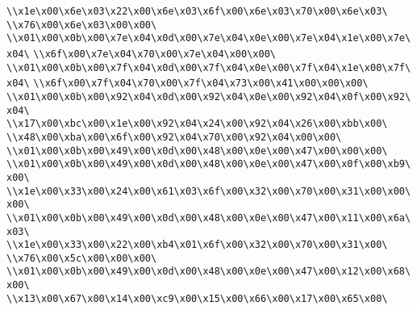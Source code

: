 \verb|\\x1e\x00\x6e\x03\x22\x00\x6e\x03\x6f\x00\x6e\x03\x70\x00\x6e\x03\|\newline
\verb|\\x76\x00\x6e\x03\x00\x00\|\newline
\verb|\\x01\x00\x0b\x00\x7e\x04\x0d\x00\x7e\x04\x0e\x00\x7e\x04\x1e\x00\x7e\x04\|\newline
\verb|\\x6f\x00\x7e\x04\x70\x00\x7e\x04\x00\x00\|\newline
\verb|\\x01\x00\x0b\x00\x7f\x04\x0d\x00\x7f\x04\x0e\x00\x7f\x04\x1e\x00\x7f\x04\|\newline
\verb|\\x6f\x00\x7f\x04\x70\x00\x7f\x04\x73\x00\x41\x00\x00\x00\|\newline
\verb|\\x01\x00\x0b\x00\x92\x04\x0d\x00\x92\x04\x0e\x00\x92\x04\x0f\x00\x92\x04\|\newline
\verb|\\x17\x00\xbc\x00\x1e\x00\x92\x04\x24\x00\x92\x04\x26\x00\xbb\x00\|\newline
\verb|\\x48\x00\xba\x00\x6f\x00\x92\x04\x70\x00\x92\x04\x00\x00\|\newline
\verb|\\x01\x00\x0b\x00\x49\x00\x0d\x00\x48\x00\x0e\x00\x47\x00\x00\x00\|\newline
\verb|\\x01\x00\x0b\x00\x49\x00\x0d\x00\x48\x00\x0e\x00\x47\x00\x0f\x00\xb9\x00\|\newline
\verb|\\x1e\x00\x33\x00\x24\x00\x61\x03\x6f\x00\x32\x00\x70\x00\x31\x00\x00\x00\|\newline
\verb|\\x01\x00\x0b\x00\x49\x00\x0d\x00\x48\x00\x0e\x00\x47\x00\x11\x00\x6a\x03\|\newline
\verb|\\x1e\x00\x33\x00\x22\x00\xb4\x01\x6f\x00\x32\x00\x70\x00\x31\x00\|\newline
\verb|\\x76\x00\x5c\x00\x00\x00\|\newline
\verb|\\x01\x00\x0b\x00\x49\x00\x0d\x00\x48\x00\x0e\x00\x47\x00\x12\x00\x68\x00\|\newline
\verb|\\x13\x00\x67\x00\x14\x00\xc9\x00\x15\x00\x66\x00\x17\x00\x65\x00\|\newline
